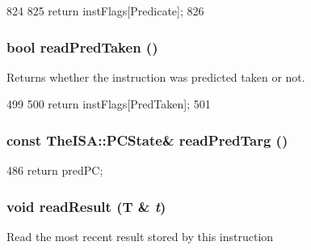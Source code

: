 \begin{DoxyCode}
824     {
825         return instFlags[Predicate];
826     }
\end{DoxyCode}
\hypertarget{classBaseDynInst_acb2c4a00f6648221dac645d267f5e766}{
\subsubsection[{readPredTaken}]{\setlength{\rightskip}{0pt plus 5cm}bool readPredTaken ()}}
\label{classBaseDynInst_acb2c4a00f6648221dac645d267f5e766}
Returns whether the instruction was predicted taken or not. 


\begin{DoxyCode}
499     {
500         return instFlags[PredTaken];
501     }
\end{DoxyCode}
\hypertarget{classBaseDynInst_a88bba628e3f9c53e98e85412e59e44fe}{
\subsubsection[{readPredTarg}]{\setlength{\rightskip}{0pt plus 5cm}const TheISA::PCState\& readPredTarg ()}}
\label{classBaseDynInst_a88bba628e3f9c53e98e85412e59e44fe}



\begin{DoxyCode}
486 { return predPC; }
\end{DoxyCode}
\hypertarget{classBaseDynInst_a87e2b2758379a95a212458692938e787}{
\subsubsection[{readResult}]{\setlength{\rightskip}{0pt plus 5cm}void readResult (T \& {\em t})}}
\label{classBaseDynInst_a87e2b2758379a95a212458692938e787}
Read the most recent result stored by this instruction 


